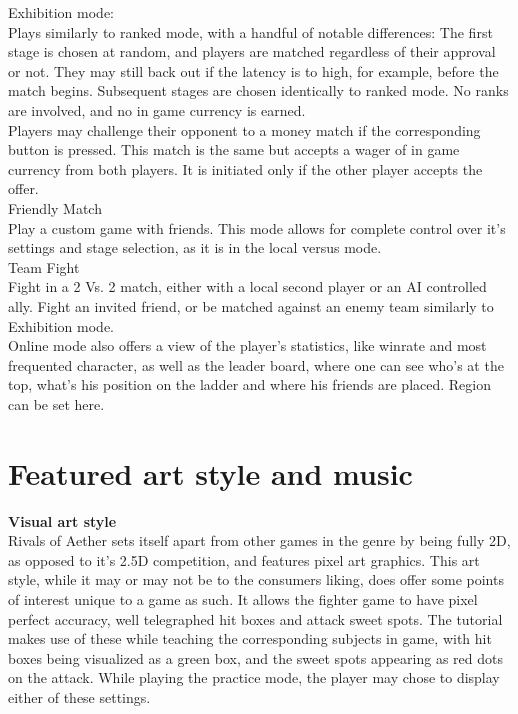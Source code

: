 \documentclass[11pt]{article}
\begin{document}
Exhibition mode:\\
Plays similarly to ranked mode, with a handful of notable differences: The first stage is chosen at random, and players are matched regardless of their approval or not. They may still back out if the latency is to high, for example, before the match begins. Subsequent stages are chosen identically to ranked mode. No ranks are involved, and no in game currency is earned.\\
Players may challenge their opponent to a money match if the corresponding button is pressed. This match is the same but accepts a wager of in game currency from both players. It is initiated only if the other player accepts the offer.\\

Friendly Match\\
Play a custom game with friends. This mode allows for complete control over it's settings and stage selection, as it is in the local versus mode.
\\
Team Fight\\
Fight in a 2 Vs. 2 match, either with a local second player or an AI controlled ally. Fight an invited friend, or be matched against an enemy team similarly to Exhibition mode.
\\

Online mode also offers a view of the player's statistics, like winrate and most frequented character, as well as the leader board, where one can see who's at the top, what's his position on the ladder and where his friends are placed. Region can be set here.\\


\chapter{Featured art style and music}

\textbf{Visual art style}\\
Rivals of Aether sets itself apart from other games in the genre by being fully 2D, as opposed to it's 2.5D competition, and features pixel art graphics. This art style, while it may or may not be to the consumers liking, does offer some points of interest unique to a game as such. It allows the fighter game to have pixel perfect accuracy, well telegraphed hit boxes and attack sweet spots. The tutorial makes use of these while teaching the corresponding subjects in game, with hit boxes being visualized as a green box, and the sweet spots appearing as red dots on the attack.
While playing the practice mode, the player may chose to display either of these settings.\\
\end{document}
